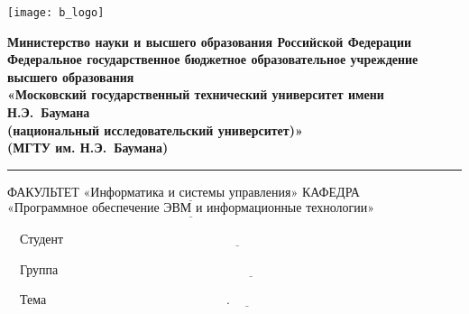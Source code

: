 


\noindent \begin{minipage}{0.15\textwidth}
	\texttt{[image: b\_logo]}
\end{minipage}
\noindent\begin{minipage}{0.9\textwidth}\centering
	\textbf{Министерство науки и высшего образования Российской Федерации}\\
	\textbf{Федеральное государственное бюджетное образовательное учреждение высшего образования}\\
	\textbf{«Московский государственный технический университет имени Н.Э.~Баумана}\\
	\textbf{(национальный исследовательский университет)»}\\
	\textbf{(МГТУ им. Н.Э.~Баумана)}
\end{minipage}

\noindent\rule{18cm}{3pt}
\newline
\noindent ФАКУЛЬТЕТ $\underline{\text{«Информатика и системы управления»}}$ \newline
\noindent КАФЕДРА $\underline{\text{«Программное обеспечение ЭВМ и информационные технологии»}}$\newline


\begin{center}
	\noindent\begin{minipage}{1.2\textwidth}\centering
		\textbf{}\newline
		\textbf{}\newline\newline\newline
	\end{minipage}
\end{center}




\noindent ~~Студент $\underline{\text{~~~~~~~~~~~~~~~~~~~~~~~~~~~~~~~~~ ~~~~~~~~~~~~~~~~~~~~~~~~~~~~~~~~~~~~~~~~~~~~~~~}}$

\noindent ~~Группа $\underline{\text{~~~~~~~~~~~~~~~~~~~~~~~~~~~~~~~~~~~~~~~~~~~~~~~~~~~~~~~~~~~~~~~~~~~~~~~~~~~~~~~~~~~~~~~~~~}}$


\noindent ~~Тема $\underline{\text{~~~~~~~~~~~~~~~~~~~~~~~~~~~~~~~~~~~~~~~~~ .~~~~~~~~~~~~~~~~~~~~~~~~~~~~~~~~~~~~~~~~~~~~~~~~~~~}}$\newline


